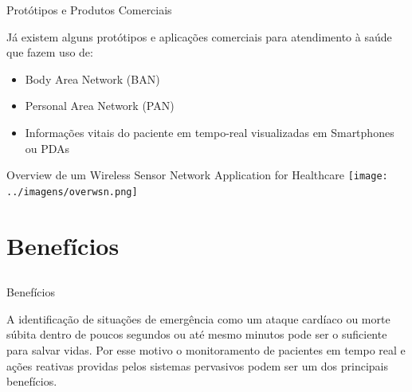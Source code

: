 \documentclass{beamer}
\begin{document}
\begin{frame}{Protótipos e Produtos Comerciais}
    \begin{block}{}
      Já existem alguns protótipos e aplicações comerciais para atendimento à saúde que fazem uso de:
	\begin{itemize}
	 \item Body Area Network (BAN)
	 \item Personal Area Network (PAN)
	 \item Informações vitais do paciente em tempo-real visualizadas em Smartphones ou PDAs
	\end{itemize}
    \end{block} 
\end{frame}


\begin{frame}{}
    \begin{block}{Overview de um Wireless Sensor Network Application for Healthcare}
      \center \texttt{[image: ../imagens/overwsn.png]}
    \end{block}
\end{frame}



\section{Benefícios}
\subsection{}
\begin{frame}{Benefícios}
\begin{block}{}
   A identificação de situações de emergência como um ataque cardíaco ou morte súbita dentro de poucos segundos ou até mesmo minutos pode ser o suficiente para salvar vidas. Por esse motivo o monitoramento de pacientes em tempo real e ações reativas providas pelos sistemas pervasivos podem ser um dos principais benefícios. 
\end{block}
\end{frame}
\end{document}
